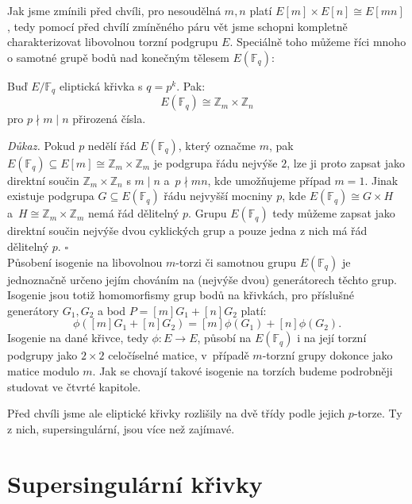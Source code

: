 \documentclass[12pt]{report}
\begin{document}
Jak jsme zmínili před chvíli, pro nesoudělná $m,n$ platí $E[m] \times E[n] \cong E[mn]$, tedy pomocí před chvílí zmíněného páru vět jsme schopni kompletně charakterizovat libovolnou torzní podgrupu $E$. Speciálně toho můžeme říci mnoho o samotné grupě bodů nad konečným tělesem $E(\mathbb{F}_q)$:

\begin{veta}
Buď $E/\mathbb{F}_q$ eliptická křivka s $q = p^k$. Pak:
\begin{equation*}
E(\mathbb{F}_q) \cong \mathbb{Z}_m \times \mathbb{Z}_n
\end{equation*}
pro $p \nmid m \mid n$ přirozená čísla.
\end{veta}
\noindent \textit{Důkaz.} Pokud $p$ nedělí řád $E(\mathbb{F}_q)$, který označme $m$, pak $E(\mathbb{F}_q) \subseteq E[m] \cong \mathbb{Z}_m \times \mathbb{Z}_m$ je podgrupa řádu nejvýše $2$, lze ji proto zapsat jako direktní součin $\mathbb{Z}_m \times \mathbb{Z}_n$ s $m \mid n$ a~$p \nmid mn$, kde umožňujeme případ $m=1$. Jinak existuje podgrupa $G \subseteq E(\mathbb{F}_q)$ řádu nejvyšší mocniny $p$, kde $E(\mathbb{F}_q) \cong G \times H$ a~$H \cong \mathbb{Z}_m \times \mathbb{Z}_m$ nemá řád dělitelný $p$. Grupu $E(\mathbb{F}_q)$ tedy můžeme zapsat jako direktní součin nejvýše dvou cyklických grup a pouze jedna z nich má řád dělitelný $p$. \hfill $\square$\\

Působení isogenie na libovolnou $m$-torzi či samotnou grupu $E(\mathbb{F}_q)$ je jednoznačně určeno jejím chováním na (nejvýše dvou) generátorech těchto grup. Isogenie jsou totiž homomorfismy grup bodů na křivkách, pro příslušné generátory $G_1,G_2$ a bod $P = [m] G_1 + [n] G_2$ platí:
\begin{equation*}
\phi([m]G_1+[n]G_2) = [m] \phi (G_1 )+ [n] \phi (G_2).
\end{equation*}
Isogenie na dané křivce, tedy $\phi : E \longrightarrow E$, působí na $E(\mathbb{F}_q)$ i na její torzní podgrupy jako $2 \times 2$ celočíselné matice, v~případě $m$-torzní grupy dokonce jako matice modulo $m$. Jak se chovají takové isogenie na torzích budeme podrobněji studovat ve čtvrté kapitole.

Před chvíli jsme ale eliptické křivky rozlišily na dvě třídy podle jejich $p$-torze. Ty  z nich, supersingulární, jsou více než zajímavé.

\section{Supersingulární křivky}
\end{document}
